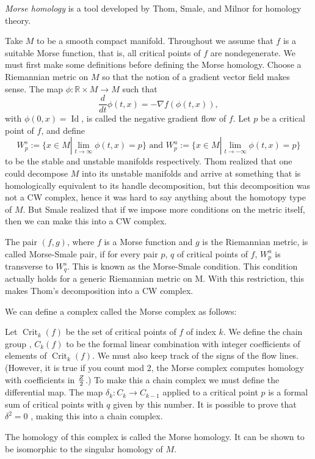\documentclass[12pt]{article}
\DeclareMathOperator{\Id}{Id}
\DeclareMathOperator{\Crit}{Crit}
\begin{document}
{\em Morse homology} is a tool developed by Thom, Smale, and Milnor for homology theory.

Take $M$ to be a smooth compact manifold. Throughout we assume that $f$ is a suitable Morse function, that is, all critical points of $f$ are nondegenerate.  We must first make some definitions before defining the Morse homology.
Choose a Riemannian metric on $M$ so that the notion of a gradient vector field makes sense.
The map $\phi\colon\mathbb{R} \times M \rightarrow M$ such that 
\[
\frac{d}{dt}\phi(t,x) = -\nabla f(\phi(t,x)),
\]
with $\phi(0,x) = \Id$, is called the negative gradient flow of $f$. Let $p$ be a critical point of $f$, and define 
\[
W_p^s :=  \{ x \in M | \lim_{t\rightarrow \infty} \phi(t,x) = p \} \text{\ and \ } W_p^u := \{ x\in M | \lim_{t \rightarrow -\infty} \phi(t,x) = p \}
\]
to be the stable and unstable manifolds respectively.
Thom realized that one could decompose $M$ into its unstable manifolds and arrive at something that is homologically equivalent to its handle decomposition, but this decomposition was not a CW complex, hence it was hard to say anything about the homotopy type of $M$. But Smale realized that if we impose more conditions on the metric itself, then we can make this into a CW complex.

The pair $(f,g)$, where $f$ is a Morse function and $g$ is the Riemannian metric, is called Morse-Smale pair, if for every pair $p$, $q$ of critical points of $f$, $W_p^u$ is transverse to $W_q^s$. This is known as the Morse-Smale condition.
This condition actually holds for a generic Riemannian metric on M. With this restriction, this makes Thom's decomposition into a CW complex.

We can define a complex called the Morse complex as follows: 

Let $\Crit_k (f)$ be the set of critical points of $f$ of index $k$. We define the chain group , $C_k(f)$ to be the formal linear combination with integer coefficients of elements of $\Crit_k (f)$. We must also keep track of the signs of the flow lines. (However, it is true if you count mod 2, the Morse complex computes homology with coefficients in $Z \over 2$.)
To make this a chain complex we must define the differential map. 
The map $\delta _k : C_k \rightarrow C_{k-1}$ applied to a critical point $p$ is a formal sum of critical points with $q$ given by this number. It is possible to prove that $\delta^2 = 0$ , making this into a chain complex.

The homology of this complex is called the Morse homology. It can be shown to be isomorphic to the singular homology of $M$. 
\end{document}
